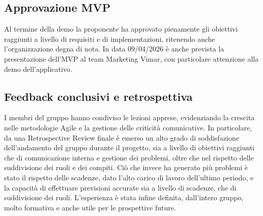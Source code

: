 \documentclass[10pt, letterpaper]{article}
\begin{document}
\subsection*{Approvazione MVP}
Al termine della demo la proponente ha approvato pienamente gli obiettivi raggiunti a livello di requisiti e di implementazioni, ritenendo anche l'organizzazione degna di nota. 
In data 09/04/2026 è anche prevista la presentazione dell'MVP al team Marketing Vimar, con particolare attenzione alla demo dell'applicativo.

\subsection*{Feedback conclusivi e retrospettiva}
I membri del gruppo hanno condiviso le lezioni apprese, evidenziando la crescita nelle metodologie Agile e la gestione delle criticità comunicative. 
In particolare, da una Retrospective Review finale è emerso un alto grado di soddisfazione dell'andamento del gruppo durante il progetto, sia a livello di obiettivi raggiunti che di comunicazione interna e 
gestione dei problemi, oltre che nel rispetto delle suddivisione dei ruoli e dei compiti. 
Ciò che invece ha generato più problemi è stato il rispetto delle scadenze, dato l'alto carico di lavoro dell'ultimo periodo, e la capacità di effettuare previsioni accurate sia a livello di scadenze, che di suddivisione dei ruoli.
L'esperienza è stata infine definita, dall'intero gruppo, molto formativa e anche utile per le prospettive future.




\makeTodoTable
\end{document}
